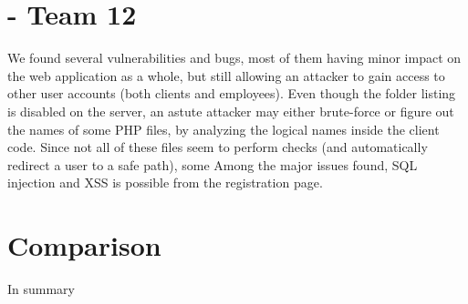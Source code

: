 \section{\gnb - Team 12}
We found several vulnerabilities and bugs, most of them having minor impact on the web application as a whole, but still allowing an attacker to gain access to other user accounts (both clients and employees).\newline\newline
Even though the folder listing is disabled on the server, an astute attacker may either brute-force or figure out the names of some PHP files, by analyzing the logical names inside the client code. Since not all of these files seem to perform checks (and automatically redirect a user to a safe path), some  
Among the major issues found, SQL injection and XSS is possible from the registration page.
\section{Comparison}
In summary
